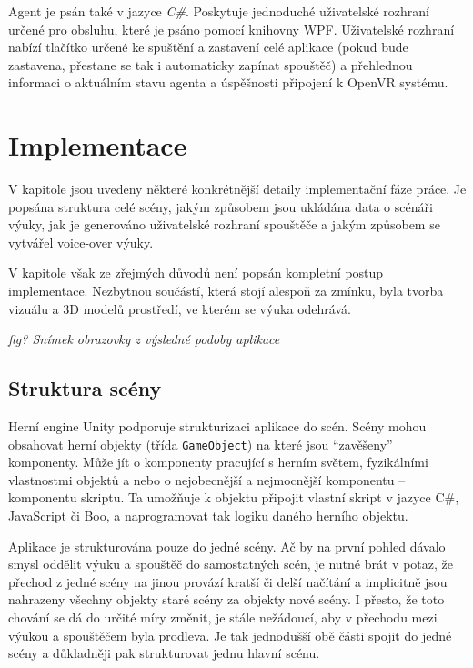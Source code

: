 Agent je psán také v jazyce \emph{C\#}. Poskytuje jednoduché uživatelské
rozhraní určené pro obsluhu, které je psáno pomocí knihovny WPF.
Uživatelské rozhraní nabízí tlačítko určené ke spuštění a zastavení celé
aplikace (pokud bude zastavena, přestane se tak i automaticky zapínat
spouštěč) a přehlednou informaci o aktuálním stavu agenta a úspěšnosti
připojení k OpenVR systému.

\section{Implementace}\label{implementace}

V kapitole jsou uvedeny některé konkrétnější detaily implementační fáze
práce. Je popsána struktura celé scény, jakým způsobem jsou ukládána
data o scénáři výuky, jak je generováno uživatelské rozhraní spouštěče a
jakým způsobem se vytvářel voice-over výuky.

V kapitole však ze zřejmých důvodů není popsán kompletní postup
implementace. Nezbytnou součástí, která stojí alespoň za zmínku, byla
tvorba vizuálu a 3D modelů prostředí, ve kterém se výuka odehrává.

\emph{fig? Snímek obrazovky z výsledné podoby aplikace}

\subsection{Struktura scény}\label{struktura-scuxe9ny}

Herní engine Unity podporuje strukturizaci aplikace do scén. Scény mohou
obsahovat herní objekty (třída \texttt{GameObject}) na které jsou
``zavěšeny'' komponenty. \autocite{unityscenes} Může jít o komponenty pracující s herním
světem, fyzikálními vlastnostmi objektů a nebo o nejobecnější a
nejmocnější komponentu -- komponentu skriptu. Ta umožňuje k objektu
připojit vlastní skript v jazyce C\#, JavaScript či Boo, a naprogramovat
tak logiku daného herního objektu.

Aplikace je strukturována pouze do jedné scény. Ač by na první pohled
dávalo smysl oddělit výuku a spouštěč do samostatných scén, je nutné
brát v potaz, že přechod z jedné scény na jinou provází kratší či delší
načítání a implicitně jsou nahrazeny všechny objekty staré scény za
objekty nové scény. I přesto, že toto chování se dá do určité míry
změnit, je stále nežádoucí, aby v přechodu mezi výukou a spouštěčem
byla prodleva. Je tak jednodušší obě části spojit do jedné scény a
důkladněji pak strukturovat jednu hlavní scénu.


